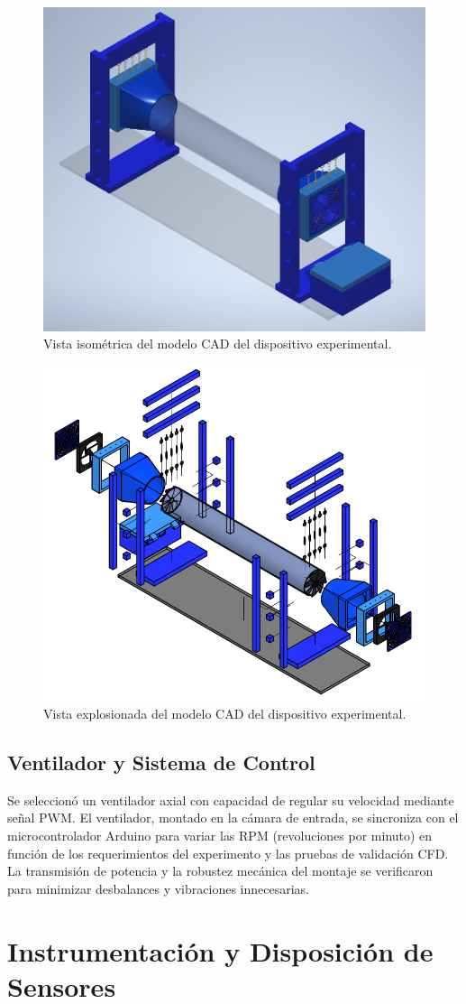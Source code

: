 \pagebreak

\begin{figure}[!ht]
    \centering
    \includegraphics[width=0.5\linewidth]{images/exp.png}
    \caption{Vista isométrica del modelo CAD del dispositivo experimental.}
    \label{fig:cad_model}
\end{figure}

\begin{figure}[!ht]
    \centering
    \includegraphics[width=0.5\linewidth]{images/explo.png}
    \caption{Vista explosionada del modelo CAD del dispositivo experimental.}
    \label{fig:explo}
\end{figure}

\subsection{Ventilador y Sistema de Control}
Se seleccionó un ventilador axial con capacidad de regular su velocidad mediante señal PWM. El ventilador, montado en la cámara de entrada, se sincroniza con el microcontrolador Arduino para variar las RPM (revoluciones por minuto) en función de los requerimientos del experimento y las pruebas de validación CFD. La transmisión de potencia y la robustez mecánica del montaje se verificaron para minimizar desbalances y vibraciones innecesarias.

\pagebreak
\section{Instrumentación y Disposición de Sensores}
